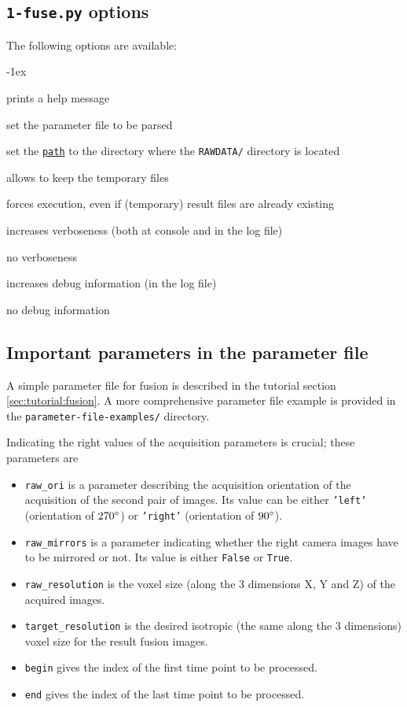 \subsection{\texttt{1-fuse.py} options}

The following options are available:
\begin{description}
  \itemsep -1ex
\item[\texttt{-h}] prints a help message
\item[\texttt{-p \underline{file}}] set the parameter file to be parsed
\item[\texttt{-e \underline{path}}] set the
  \texttt{\underline{path}} to the directory where the
  \texttt{RAWDATA/} directory is located
\item[\texttt{-k}] allows to keep the temporary files
\item[\texttt{-f}] forces execution, even if (temporary) result files
  are already existing
\item[\texttt{-v}] increases verboseness (both at console and in the
  log file)
\item[\texttt{-nv}] no verboseness
\item[\texttt{-d}]  increases debug information (in the
  log file)
\item[\texttt{-nd}] no debug information
\end{description}


\subsection{Important parameters in the parameter file}
\label{sec:cli:fuse:important:parameters}

A simple parameter file for fusion is described in the tutorial
section \ref{sec:tutorial:fusion}. A more comprehensive parameter file
example is provided in the \texttt{parameter-file-examples/} directory.

Indicating the right values of the
acquisition parameters is crucial; these parameters are
\begin{itemize}
\itemsep -1ex
\item \texttt{raw\_ori} is a parameter describing the acquisition
  orientation of the acquisition of the second pair of images. Its value can be either \texttt{'left'} (orientation of
  $270 \degree$) or \texttt{'right'} (orientation of
  $90 \degree$).
\item \texttt{raw\_mirrors} is a parameter indicating whether the
  right camera images have to be mirrored or not. Its value is either
  \texttt{False} or \texttt{True}.
\item \texttt{raw\_resolution} is the voxel size (along the 3
    dimensions X, Y and Z) of the acquired images.
\item \texttt{target\_resolution} is the desired isotropic (the
    same along the 3 dimensions) voxel size for the result fusion
    images.
\item \texttt{begin} gives the index of the first time point to be
  processed.
\item \texttt{end} gives the index of the last time point to be processed.
\end{itemize}


